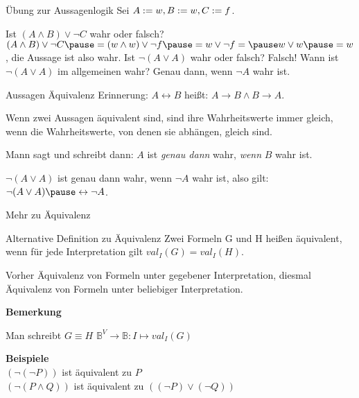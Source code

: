 \begin{frame}{Übung zur Aussagenlogik}
	\pause Sei $A := w, B := w, C := f$.
	
	\begin{itemize}
		\pitem Ist $(A \land B) \lor \lnot C$ wahr oder falsch? \pause $(A \land B) \lor \lnot C \pause = (\W \land \W) \lor \lnot \F \pause = \W \lor \lnot \F = \pause \W \lor \W \pause = \W$\pause , die Aussage ist also wahr.
		\pitem Ist $\lnot (A \lor A)$ wahr oder falsch? \pause Falsch! \pause Wann ist $\lnot (A \lor A)$ im allgemeinen wahr? \pause Genau dann, wenn $\lnot A$ wahr ist.
	\end{itemize}

	\pause

	\begin{block}{Aussagen Äquivalenz}
		Erinnerung: \pause $A \leftrightarrow B$ heißt: \pause $A \rightarrow B \land B \rightarrow A$. 
		
		\pause Wenn zwei Aussagen äquivalent sind, sind ihre Wahrheitswerte immer gleich\pause , wenn die Wahrheitswerte, von denen sie abhängen, gleich sind. 
		
		\pause Mann sagt und schreibt dann: \pause $A$ ist \emph{genau dann} wahr, \emph{wenn} $B$ wahr ist.
	\end{block}

	\begin{itemize}
		\pitem $\lnot (A \lor A)$ ist genau dann wahr\pause , wenn $\lnot A$ wahr ist\pause , also gilt:  $\lnot (A \lor A) \pause \leftrightarrow \lnot A$. 
	\end{itemize}
\end{frame}

\begin{frame}{Mehr zu Äquivalenz}
\pause
	\begin{block}{Alternative Definition zu Äquivalenz}
		Zwei Formeln G und H heißen äquivalent, wenn für jede Interpretation gilt $val_I(G) = val_I(H)$.
	\end{block}\pause

	Vorher Äquivalenz von Formeln unter gegebener Interpretation\pause , diesmal Äquivalenz von Formeln unter beliebiger Interpretation.\pause

	\textbf{Bemerkung}\\
	\begin{itemize}
		\pitem Man schreibt $G \equiv  H$
		\pitem $\mathbb{B}^V \rightarrow \mathbb{B}: I \mapsto val_I(G)$
	\end{itemize}\pause
	\textbf{Beispiele}\\\pause
	$(\lnot(\lnot P))$ ist äquivalent zu $P$\\\pause
	$(\lnot(P\land Q))$ ist äquivalent zu $((\lnot P) \lor (\lnot Q))$
\end{frame}

